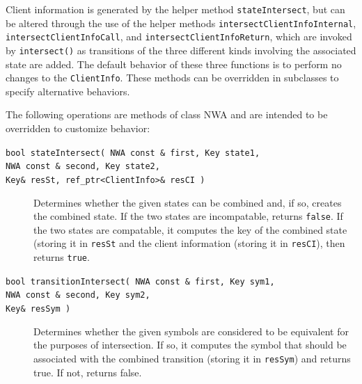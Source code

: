 Client information is generated by the helper method \texttt{stateIntersect},
but can be altered through the use of the helper methods
\texttt{intersectClientInfoInternal}, \texttt{intersectClientInfoCall}, and
\texttt{intersect\-Client\-InfoReturn}, which are invoked by
\texttt{intersect()} as transitions of the three different kinds involving the
associated state are added.  The default behavior of these three functions is
to perform no changes to the \texttt{ClientInfo}.  These methods can be
overridden in subclasses to specify alternative behaviors.

\goodbreak
\noindent The following operations are methods of class NWA and are intended
to be overridden to customize behavior:

\begin{description}

  \item[\texttt{bool stateIntersect( NWA const \& first, Key state1,\\ 
                   \hspace*{3.25cm} NWA const \& second, Key state2,\\
                   \hspace*{3.25cm} Key\& resSt, ref\_ptr<ClientInfo>\& resCI )}]
    \nopagebreak

    Determines whether the given states can be combined and,
    if so, creates the combined state. If the two states are incompatable,
    returns \texttt{false}. If the two states are compatable, it computes the
    key of the combined state (storing it in \texttt{resSt} and the client
    information (storing it in \texttt{resCI}), then returns \texttt{true}.

  \item[\texttt{bool transitionIntersect( NWA const \& first, Key
    sym1,\\ \hspace*{3.25cm} NWA const \& second, Key
    sym2,\\ \hspace*{3.25cm} Key\& resSym )}] \nopagebreak

    Determines whether the given symbols are considered to be equivalent for
    the purposes of intersection. If so, it computes the symbol that should
    be associated with the combined transition (storing it in
    \texttt{resSym}) and returns true. If not, returns false.


\end{description}
